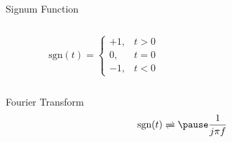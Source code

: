\documentclass[t]{beamer}
\begin{document}
\begin{frame}{Signum Function}
  \begin{columns}
    \begin{column}{0.5\textwidth}
      \begin{equation*}
        \text{sgn}(t) = \left\{
                  \begin{array}{rr}
                  +1, & t > 0 \\
                   0, & t = 0 \\
                  -1, & t < 0 
                  \end{array}
                \right.
      \end{equation*}
    \end{column}

    \begin{column}{0.5\textwidth}
      \begin{figure}
        \centering
      \end{figure}
    \end{column}
  \end{columns}
  \pause
  Fourier Transform
  \begin{equation*}
    \text{sgn}(t) \xrightleftharpoons{} \pause \frac{1}{j\pi f}
  \end{equation*}

\end{frame}
\end{document}
